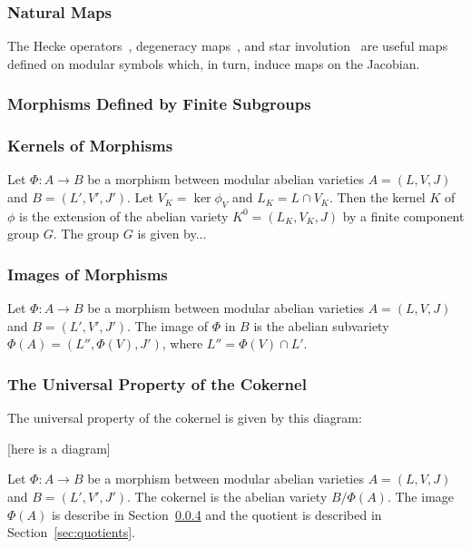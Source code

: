 \documentclass{article}
\begin{document}
\subsubsection{Natural Maps}

The Hecke operators~\cite[\S 8.3]{stein:modform}, degeneracy maps~\cite[\S
8.6]{stein:modform}, and star involution~\cite[\S 8.5]{stein:modform} are
useful maps defined on modular symbols which, in turn, induce maps on the
Jacobian.

\subsubsection{Morphisms Defined by Finite Subgroups}

\subsubsection{Kernels of Morphisms}
\label{sec:kernelmodabvar}

Let $\Phi:A\to B$ be a morphism between modular abelian varieties $A=(L, V, J)$
and $B=(L', V', J')$. Let $V_K=\ker \phi_V$ and $L_K=L\cap V_K$. Then the
kernel $K$ of $\phi$ is the extension of the abelian variety $K^0 = (L_K, V_K,
J)$ by a finite component group $G$. The group $G$ is given by...

\subsubsection{Images of Morphisms}
\label{sec:image}

Let $\Phi:A\to B$ be a morphism between modular abelian varieties $A=(L, V, J)$
and $B=(L', V', J')$. The image of $\Phi$ in $B$ is the abelian subvariety
$\Phi(A)=(L'', \Phi(V), J')$, where $L''=\Phi(V)\cap L'$.


\subsubsection{The Universal Property of the Cokernel}

The universal property of the cokernel is given by this diagram:

[here is a diagram]

Let $\Phi:A\to B$ be a morphism between modular abelian varieties $A=(L, V, J)$
and $B=(L', V', J')$. The cokernel is the abelian variety $B/\Phi(A)$. The
image $\Phi(A)$ is describe in Section~\ref{sec:image} and the quotient is
described in Section~\ref{sec:quotients}.
\end{document}
